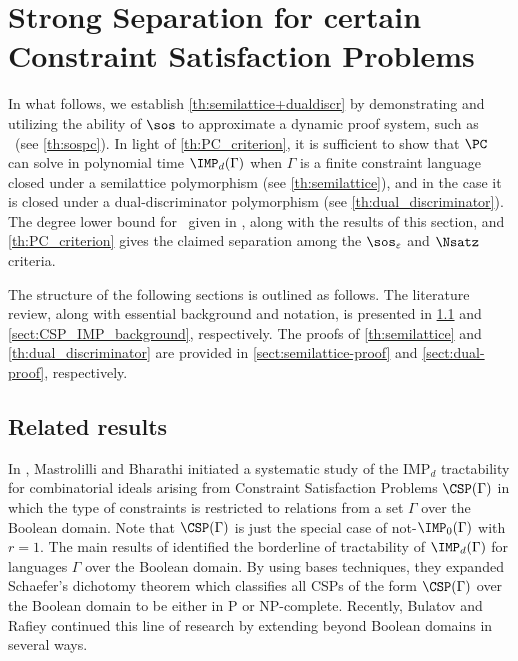 \documentclass[11pt]{article}
\begin{document}
\section{Strong Separation for certain Constraint Satisfaction Problems}\label{sect:applications}
 In what follows, we establish \cref{th:semilattice+dualdiscr} by demonstrating and utilizing the ability of \(\sos\) to approximate a dynamic proof system, such as \PC\ (see \cref{th:sospc}).
 In light of \cref{th:PC_criterion}, it is sufficient to show that $\PC$ can solve in polynomial time $\IMP_d(\Gamma)$ when $\Gamma$ is a finite constraint language closed under a semilattice polymorphism (see \cref{th:semilattice}), and in the case it is closed under a dual-discriminator polymorphism (see \cref{th:dual_discriminator}). 
%
 The degree lower bound for \Nsatz\ given in \cite{BussP98}, along with the results of this section, and \cref{th:PC_criterion} gives the claimed separation among the $\sos_{\varepsilon}$ and $\Nsatz$ criteria. 

The structure of the following sections is outlined as follows. The literature review, along with essential background and notation, is presented in \cref{sect:csp_literature} and \cref{sect:CSP_IMP_background}, respectively. The proofs of \cref{th:semilattice} and \cref{th:dual_discriminator} are provided in \cref{sect:semilattice-proof} and \cref{sect:dual-proof}, respectively.
\subsection{Related results} \label{sect:csp_literature}
In \cite{Mastrolilli21TALG, BharathiM21}, Mastrolilli and Bharathi initiated a systematic study of the IMP$_d$ tractability for combinatorial ideals arising from Constraint Satisfaction Problems $\CSP(\Gamma)$ in which the type of constraints is restricted to relations from a set $\Gamma$ over the Boolean domain.
Note that $\CSP(\Gamma)$ is just the special case of not-$\IMP_0(\Gamma)$ with $r=1$.
The main results of \cite{Mastrolilli21TALG, BharathiM21} identified the borderline of tractability of $\IMP_d(\Gamma)$ for languages $\Gamma$ over the Boolean domain. By using \GB bases techniques, they expanded Schaefer's dichotomy theorem \cite{Schaefer78} which classifies all CSPs of the form $\CSP(\Gamma)$ over the Boolean domain to be either in P or NP-complete. Recently, Bulatov and Rafiey \cite{BulatovRSTOC22, BulatovRSTACS22} continued this line of research by extending \cite{Mastrolilli21TALG, BharathiM21} beyond Boolean domains in several ways. %
\end{document}
